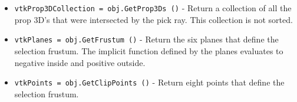 \begin{itemize}
\item  \verb|vtkProp3DCollection = obj.GetProp3Ds ()| -  Return a collection of all the prop 3D's that were intersected
 by the pick ray. This collection is not sorted.

\item  \verb|vtkPlanes = obj.GetFrustum ()| -  Return the six planes that define the selection frustum. The implicit 
 function defined by the planes evaluates to negative inside and positive
 outside.

\item  \verb|vtkPoints = obj.GetClipPoints ()| -  Return eight points that define the selection frustum.

\end{itemize}
